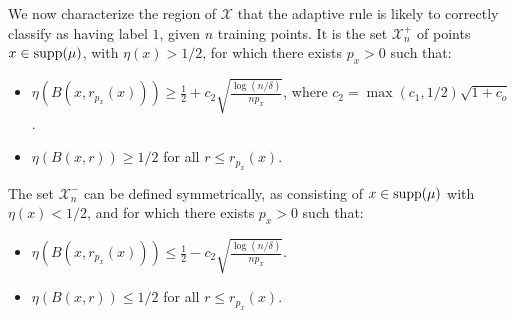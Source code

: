 \documentclass{article}
\def\X{{\mathcal X}}
\def\supp{{\rm supp}}
\begin{document}
We now characterize the region of $\X$ that the adaptive rule is likely to correctly classify as having label $1$, given $n$ training points. It is the set $\X^+_n$ of points $x \in \supp(\mu)$, with $\eta(x) > 1/2$, for which there exists $p_x > 0$ such that:
\begin{itemize}
\item $\eta(B(x,r_{p_x}(x))) \geq \frac{1}{2} + c_2 \sqrt{\frac{\log (n/\delta)}{np_x}}$, where $c_2 = \max(c_1, 1/2) \sqrt{1+c_o}$. 
\item $\eta(B(x,r)) \geq 1/2$ for all $r \leq r_{p_x}(x)$. 
\end{itemize}
The set $\X^-_n$ can be defined symmetrically, as consisting of $x \in \supp(\mu)$ with $\eta(x) < 1/2$, and for which there exists $p_x > 0$ such that:
\begin{itemize}
\item $\eta(B(x,r_{p_x}(x))) \leq \frac{1}{2} - c_2 \sqrt{\frac{\log (n/\delta)}{np_x}}$. 
\item $\eta(B(x,r)) \leq 1/2$ for all $r \leq r_{p_x}(x)$. 
\end{itemize}
\end{document}

